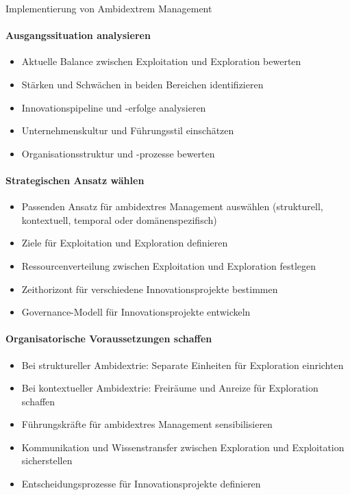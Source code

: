 \begin{KR}{Implementierung von Ambidextrem Management}\\
\paragraph{Ausgangssituation analysieren}
\begin{itemize}
    \item Aktuelle Balance zwischen Exploitation und Exploration bewerten
    \item Stärken und Schwächen in beiden Bereichen identifizieren
    \item Innovationspipeline und -erfolge analysieren
    \item Unternehmenskultur und Führungsstil einschätzen
    \item Organisationsstruktur und -prozesse bewerten
\end{itemize}

\paragraph{Strategischen Ansatz wählen}
\begin{itemize}
    \item Passenden Ansatz für ambidextres Management auswählen (strukturell, kontextuell, temporal oder domänenspezifisch)
    \item Ziele für Exploitation und Exploration definieren
    \item Ressourcenverteilung zwischen Exploitation und Exploration festlegen
    \item Zeithorizont für verschiedene Innovationsprojekte bestimmen
    \item Governance-Modell für Innovationsprojekte entwickeln
\end{itemize}

\paragraph{Organisatorische Voraussetzungen schaffen}
\begin{itemize}
    \item Bei struktureller Ambidextrie: Separate Einheiten für Exploration einrichten
    \item Bei kontextueller Ambidextrie: Freiräume und Anreize für Exploration schaffen
    \item Führungskräfte für ambidextres Management sensibilisieren
    \item Kommunikation und Wissenstransfer zwischen Exploration und Exploitation sicherstellen
    \item Entscheidungsprozesse für Innovationsprojekte definieren
\end{itemize}


\end{KR}
